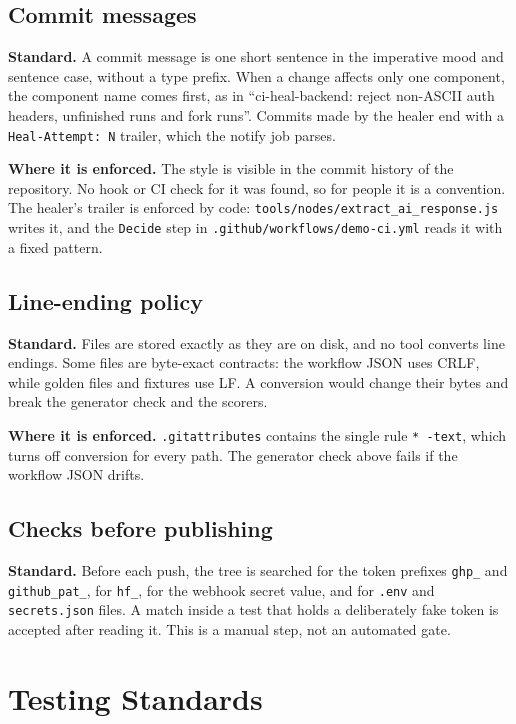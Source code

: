 \subsection{Commit messages}

\textbf{Standard.} A commit message is one short sentence in the imperative mood and sentence case, without a type prefix. When a change affects only one component, the component name comes first, as in ``ci-heal-backend: reject non-ASCII auth headers, unfinished runs and fork runs''. Commits made by the healer end with a \texttt{Heal-Attempt: N} trailer, which the notify job parses.

\textbf{Where it is enforced.} The style is visible in the commit history of the repository. No hook or CI check for it was found, so for people it is a convention. The healer's trailer is enforced by code: \texttt{tools/\allowbreak{}nodes/\allowbreak{}extract\_\allowbreak{}ai\_\allowbreak{}response.js} writes it, and the \texttt{Decide} step in \texttt{.github/\allowbreak{}workflows/\allowbreak{}demo-ci.yml} reads it with a fixed pattern.

\subsection{Line-ending policy}

\textbf{Standard.} Files are stored exactly as they are on disk, and no tool converts line endings. Some files are byte-exact contracts: the workflow JSON uses CRLF, while golden files and fixtures use LF. A conversion would change their bytes and break the generator check and the scorers.

\textbf{Where it is enforced.} \texttt{.gitattributes} contains the single rule \texttt{* -text}, which turns off conversion for every path. The generator check above fails if the workflow JSON drifts.

\subsection{Checks before publishing}

\textbf{Standard.} Before each push, the tree is searched for the token prefixes \texttt{ghp\_} and \texttt{github\_pat\_}, for \texttt{hf\_}, for the webhook secret value, and for \texttt{.env} and \texttt{secrets.json} files. A match inside a test that holds a deliberately fake token is accepted after reading it. This is a manual step, not an automated gate.

\section{Testing Standards}

